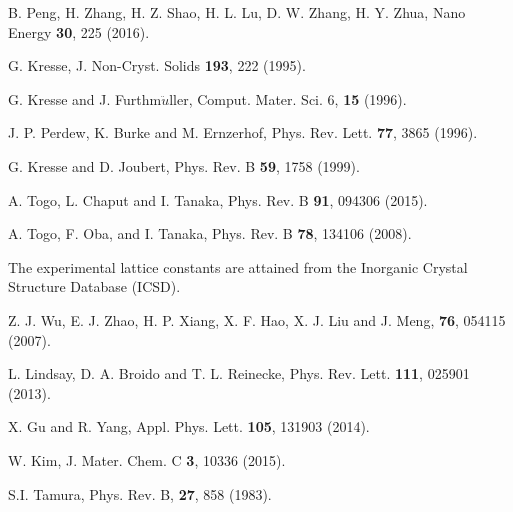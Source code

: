 \documentclass[twocolumn,showkeys,aps,prb,showpacs]{revtex4-1}
\begin{document}
\begin{references}
 B. Peng, H. Zhang, H. Z. Shao, H. L. Lu, D. W. Zhang, H. Y. Zhua, Nano Energy  \textbf{30}, 225 (2016).

 G. Kresse, J. Non-Cryst. Solids \textbf{193}, 222 (1995).

 G. Kresse and J. Furthm$\ddot{u}$ller, Comput. Mater. Sci. 6, \textbf{15} (1996).



J. P. Perdew, K. Burke and M. Ernzerhof, Phys. Rev. Lett. \textbf{77}, 3865 (1996).

 G. Kresse and D. Joubert, Phys. Rev. B \textbf{59}, 1758 (1999).

A. Togo, L. Chaput and I. Tanaka, Phys. Rev. B \textbf{91}, 094306 (2015).

A. Togo, F. Oba, and I. Tanaka, Phys. Rev. B \textbf{78}, 134106
(2008).



  The experimental lattice constants are attained from  the Inorganic Crystal Structure Database (ICSD).

 Z. J. Wu,  E. J.  Zhao, H. P. Xiang, X. F. Hao,  X. J. Liu  and J. Meng, \textbf{76}, 054115 (2007).

  L. Lindsay, D. A. Broido and T. L. Reinecke, Phys. Rev. Lett.  \textbf{111}, 025901 (2013).


X. Gu and R. Yang, Appl. Phys. Lett.  \textbf{105}, 131903 (2014).


 W. Kim, J. Mater. Chem. C  \textbf{3}, 10336 (2015).


S.I. Tamura, Phys. Rev. B, \textbf{27}, 858 (1983).
\end{references}
\end{document}
